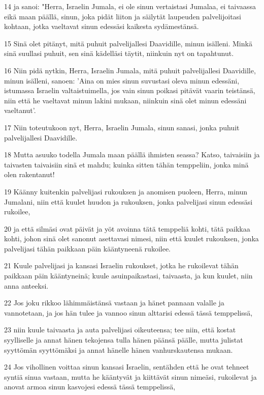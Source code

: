 \par 14 ja sanoi: "Herra, Israelin Jumala, ei ole sinun vertaistasi Jumalaa, ei taivaassa eikä maan päällä, sinun, joka pidät liiton ja säilytät laupeuden palvelijoitasi kohtaan, jotka vaeltavat sinun edessäsi kaikesta sydämestänsä.
\par 15 Sinä olet pitänyt, mitä puhuit palvelijallesi Daavidille, minun isälleni. Minkä sinä suullasi puhuit, sen sinä kädelläsi täytit, niinkuin nyt on tapahtunut.
\par 16 Niin pidä nytkin, Herra, Israelin Jumala, mitä puhuit palvelijallesi Daavidille, minun isälleni, sanoen: 'Aina on mies sinun suvustasi oleva minun edessäni, istumassa Israelin valtaistuimella, jos vain sinun poikasi pitävät vaarin teistänsä, niin että he vaeltavat minun lakini mukaan, niinkuin sinä olet minun edessäni vaeltanut'.
\par 17 Niin toteutukoon nyt, Herra, Israelin Jumala, sinun sanasi, jonka puhuit palvelijallesi Daavidille.
\par 18 Mutta asuuko todella Jumala maan päällä ihmisten seassa? Katso, taivaisiin ja taivasten taivaisiin sinä et mahdu; kuinka sitten tähän temppeliin, jonka minä olen rakentanut!
\par 19 Käänny kuitenkin palvelijasi rukouksen ja anomisen puoleen, Herra, minun Jumalani, niin että kuulet huudon ja rukouksen, jonka palvelijasi sinun edessäsi rukoilee,
\par 20 ja että silmäsi ovat päivät ja yöt avoinna tätä temppeliä kohti, tätä paikkaa kohti, johon sinä olet sanonut asettavasi nimesi, niin että kuulet rukouksen, jonka palvelijasi tähän paikkaan päin kääntyneenä rukoilee.
\par 21 Kuule palvelijasi ja kansasi Israelin rukoukset, jotka he rukoilevat tähän paikkaan päin kääntyneinä; kuule asuinpaikastasi, taivaasta, ja kun kuulet, niin anna anteeksi.
\par 22 Jos joku rikkoo lähimmäistänsä vastaan ja hänet pannaan valalle ja vannotetaan, ja jos hän tulee ja vannoo sinun alttarisi edessä tässä temppelissä,
\par 23 niin kuule taivaasta ja auta palvelijasi oikeuteensa; tee niin, että kostat syylliselle ja annat hänen tekojensa tulla hänen päänsä päälle, mutta julistat syyttömän syyttömäksi ja annat hänelle hänen vanhurskautensa mukaan.
\par 24 Jos vihollinen voittaa sinun kansasi Israelin, sentähden että he ovat tehneet syntiä sinua vastaan, mutta he kääntyvät ja kiittävät sinun nimeäsi, rukoilevat ja anovat armoa sinun kasvojesi edessä tässä temppelissä,
